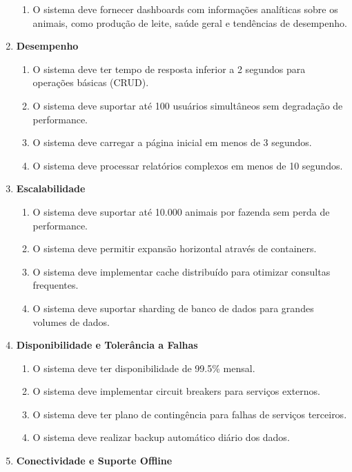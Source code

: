 \documentclass[12pt, a4paper]{article}
\begin{document}
\begin{spacing}{1.5}
\begin{spacing}{1.5}
\begin{enumerate}[label=RNF0\arabic{*}.]
\begin{enumerate}[label=RF05.0\arabic{*}]
        \item O sistema deve fornecer dashboards com informações analíticas sobre os animais, como produção de leite, saúde geral e tendências de desempenho.
    \end{enumerate}
    \item \textbf{Desempenho}
    \begin{enumerate}[label=RNF06.0\arabic{*}]
        \item O sistema deve ter tempo de resposta inferior a 2 segundos para operações básicas (CRUD).
        \item O sistema deve suportar até 100 usuários simultâneos sem degradação de performance.
        \item O sistema deve carregar a página inicial em menos de 3 segundos.
        \item O sistema deve processar relatórios complexos em menos de 10 segundos.
    \end{enumerate}
    \item \textbf{Escalabilidade}
    \begin{enumerate}[label=RNF07.0\arabic{*}]
        \item O sistema deve suportar até 10.000 animais por fazenda sem perda de performance.
        \item O sistema deve permitir expansão horizontal através de containers.
        \item O sistema deve implementar cache distribuído para otimizar consultas frequentes.
        \item O sistema deve suportar sharding de banco de dados para grandes volumes de dados.
    \end{enumerate}
    \item \textbf{Disponibilidade e Tolerância a Falhas}
    \begin{enumerate}[label=RNF08.0\arabic{*}]
        \item O sistema deve ter disponibilidade de 99.5\% mensal.
        \item O sistema deve implementar circuit breakers para serviços externos.
        \item O sistema deve ter plano de contingência para falhas de serviços terceiros.
        \item O sistema deve realizar backup automático diário dos dados.
    \end{enumerate}
    \item \textbf{Conectividade e Suporte Offline}
    \begin{enumerate}[label=RNF09.0\arabic{*}]

\end{enumerate}
\end{enumerate}
\end{spacing}
\end{spacing}
\end{document}
